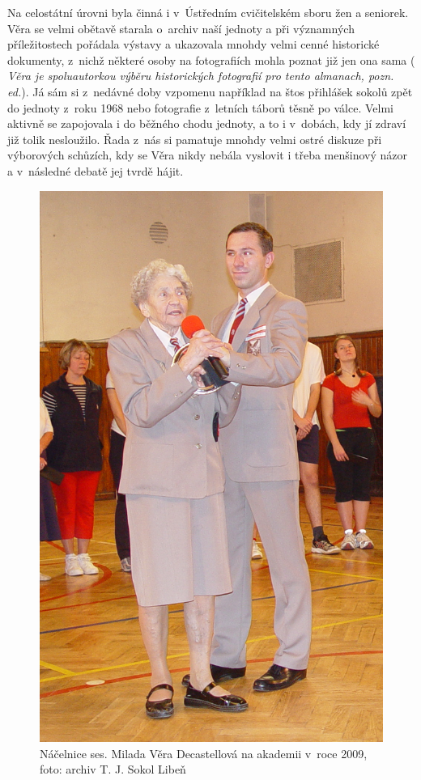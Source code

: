 \documentclass[a5paper, 11pt, twoside]{article}
\newcommand{\pozned}[1]{%
\textit{#1}}
\begin{document}
Na celostátní úrovni byla činná i v~Ústředním cvičitelském sboru žen a
seniorek. Věra se velmi obětavě starala o~archiv naší jednoty a při
významných příležitostech pořádala výstavy a ukazovala mnohdy velmi
cenné historické dokumenty, z~nichž některé osoby na fotografiích mohla
poznat již jen ona sama (\pozned{Věra je spoluautorkou výběru historických
fotografií pro tento almanach, pozn. ed.}). Já sám si z~nedávné doby
vzpomenu například na štos přihlášek sokolů zpět do jednoty z~roku 1968
nebo fotografie z~letních táborů těsně po válce. Velmi aktivně se
zapojovala i do běžného chodu jednoty, a to i v~dobách, kdy jí zdraví
již tolik nesloužilo. Řada z~nás si pamatuje mnohdy velmi ostré diskuze
při výborových schůzích, kdy se Věra nikdy nebála vyslovit i třeba
menšinový názor a v~následné debatě jej tvrdě hájit.

\begin{figure}
  \centering 
  \includegraphics[width=0.9\linewidth]{img/73_vera_cedok.JPG}
  \caption*{Náčelnice ses. Milada Věra Decastellová na akademii v~roce 2009,
  foto: archiv T. J. Sokol Libeň}
\end{figure}
\end{document}
